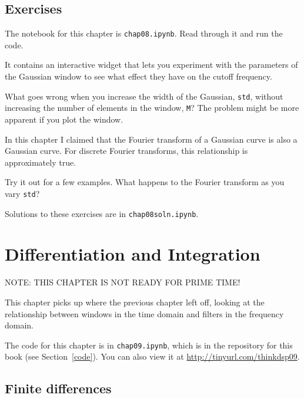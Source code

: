\documentclass[12pt]{book}
\begin{document}
\section{Exercises}

\begin{exercise}
The notebook for this chapter is {\tt chap08.ipynb}.
Read through it and run the code.

It contains an interactive widget that lets you
experiment with the parameters of the Gaussian window to see
what effect they have on the cutoff frequency.

What goes wrong when you increase the width of the Gaussian,
{\tt std}, without increasing the number of elements in the window,
{\tt M}?  The problem might be more apparent if you plot the
window.
\end{exercise}


\begin{exercise}
In this chapter I claimed that the Fourier transform of a Gaussian
curve is also a Gaussian curve.  For discrete Fourier transforms,
this relationship is approximately true.

Try it out for a few examples.  What happens to the Fourier transform
as you vary {\tt std}?
\end{exercise}


Solutions to these exercises are in {\tt chap08soln.ipynb}.



\chapter{Differentiation and Integration}
\label{diffint}

NOTE: THIS CHAPTER IS NOT READY FOR PRIME TIME!

This chapter picks up where the previous chapter left off,
looking at the relationship between windows in the time domain
and filters in the frequency domain.

The code for this chapter is in {\tt chap09.ipynb}, which is in the
repository for this book (see Section~\ref{code}).
You can also view it at \url{http://tinyurl.com/thinkdsp09}.


\section{Finite differences}
\end{document}
